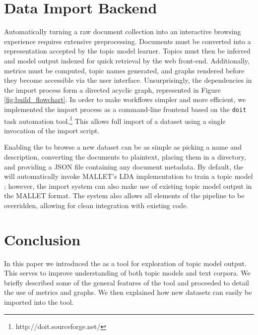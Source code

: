\documentclass[11pt]{article}
\begin{document}
\section{Data Import Backend}
Automatically turning a raw document collection into an interactive browsing
experience requires extensive preprocessing. Documents must be converted into a
representation accepted by the topic model learner. Topics must then be inferred
and model output indexed for quick retrieval by the web front-end.
Additionally, metrics must be computed, topic names generated, and graphs rendered
before they become accessible via the user interface. Unsurprisingly, the dependencies
in the import process form a directed acyclic graph, represented in Figure \ref{fig:build_flowchart}.
In order to make workflows simpler and more efficient, we implemented
the import process as a command-line frontend based on the \texttt{doit}
task automation tool.\footnote{http://doit.sourceforge.net/} This allows full
import of a dataset using a single invocation of the import script.

Enabling the \tool{} to browse a new dataset can be as simple as picking a name
and description, converting the documents to plaintext, placing them in a
directory, and providing a JSON file containing any document metadata. By default,
the \tool{} will automatically invoke MALLET's LDA implementation to train a
topic model \cite{McCallum2002}; however, the import system can also make use of
existing topic model output in the MALLET format. The system also allows all
elements of the pipeline to be overridden, allowing for clean integration with
existing code.

\section{Conclusion}
In this paper we introduced the \tool{} as a tool for exploration of
topic model output. This serves to improve understanding of both topic models
and text corpora. We briefly described some of the general features of the tool
and proceeded to detail the use of metrics and graphs. We then explained how
new datasets can easily be imported into the tool.



\end{document}

